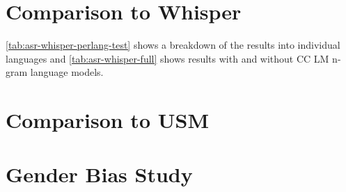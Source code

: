 \newpage
\section{Comparison to Whisper}
\label{app:asr-whisper}

\autoref{tab:asr-whisper-perlang-test} shows a breakdown of the results into individual languages and \autoref{tab:asr-whisper-full} shows results with and without CC LM n-gram language models.

\insertResultsASRWisperPerLang

\insertResultsASRWisperFull



\clearpage
\section{Comparison to USM}
\label{app:finetune-fleurs-results}

\insertResultsASRUSMFull



\section{Gender Bias Study}
\label{app:gender-bias-study}

\insertResultsGenderBiasFull
